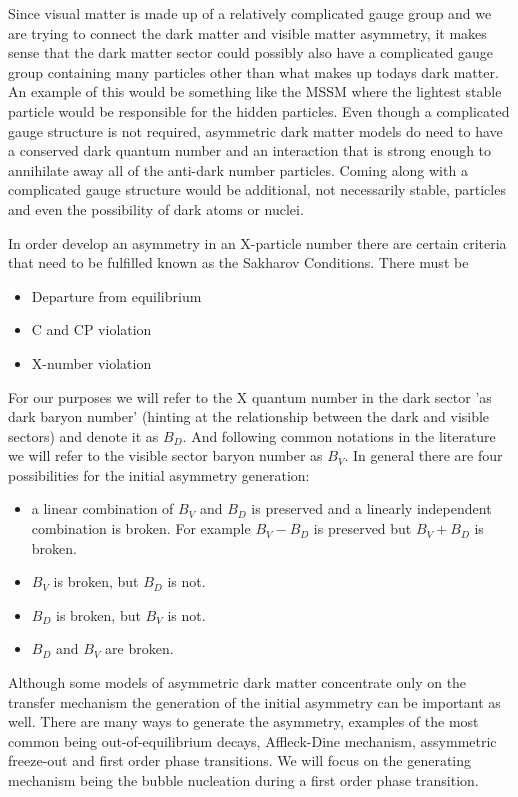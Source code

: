 Since visual matter is made up of a relatively complicated gauge group and we are trying to connect the dark matter and visible matter asymmetry, it makes sense that 
the dark matter sector could possibly also have a complicated gauge group containing many particles other than what makes up todays dark matter. An example of this would 
be something like the MSSM where the lightest stable particle would be responsible for the hidden particles. Even though a complicated gauge structure is not required, 
asymmetric dark matter models do need to have a conserved dark quantum number and an interaction that is strong enough to annihilate away all of the anti-dark number 
particles. Coming along with a complicated gauge structure would be additional, not necessarily stable, particles and even the possibility of dark atoms or nuclei. 

In order develop an asymmetry in an X-particle number there are certain criteria that need to be fulfilled known as the Sakharov Conditions. There must be
\begin{itemize}
    \item Departure from equilibrium 
    \item C and CP violation
    \item X-number violation
\end{itemize}
For our purposes we will refer to the X quantum number in the dark sector 'as dark baryon number' (hinting at the relationship between the dark and visible sectors) and 
denote it as $B_D$. And following common notations in the literature we will refer to the visible sector baryon number as $B_V$.  
In general there are four possibilities for the initial asymmetry generation:
\begin{itemize}
    \item a linear combination of $B_V$ and $B_D$ is preserved and a linearly independent combination is broken. For example $B_V - B_D$ is preserved but $B_V+B_D$ is broken.
    \item $B_V$ is broken, but $B_D$ is not.
    \item $B_D$ is broken, but $B_V$ is not.
    \item $B_D$ and $B_V$ are broken.
\end{itemize} 
Although some models of asymmetric dark matter concentrate only on the transfer mechanism the generation of the initial asymmetry can be important as well. There are many 
ways to generate the asymmetry, examples of the most common being out-of-equilibrium decays, Affleck-Dine mechanism, assymmetric freeze-out and first order phase transitions.
We will focus on the generating mechanism being the bubble nucleation during a first order phase transition.

